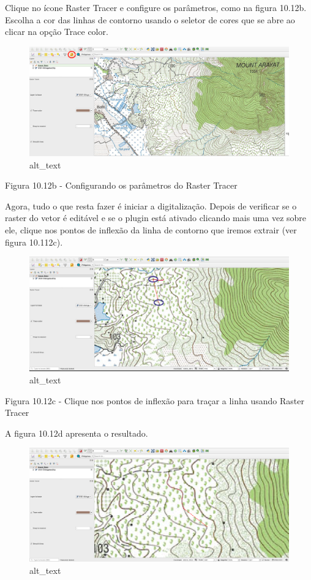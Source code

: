 \documentclass[
  portuguese,
]{krantz}
\begin{document}
Clique no ícone Raster Tracer e configure os parâmetros, como na figura 10.12b. Escolha a cor das linhas de contorno usando o seletor de cores que se abre ao clicar na opção Trace color.

\begin{figure}
\centering
\includegraphics{media/modulo10/fig1012_b.png}
\caption{alt\_text}
\end{figure}

Figura 10.12b - Configurando os parâmetros do Raster Tracer

Agora, tudo o que resta fazer é iniciar a digitalização. Depois de verificar se o raster do vetor é editável e se o plugin está ativado clicando mais uma vez sobre ele, clique nos pontos de inflexão da linha de contorno que iremos extrair (ver figura 10.112c).

\begin{figure}
\centering
\includegraphics{media/modulo10/fig1012_c.png}
\caption{alt\_text}
\end{figure}

Figura 10.12c - Clique nos pontos de inflexão para traçar a linha usando Raster Tracer

A figura 10.12d apresenta o resultado.

\begin{figure}
\centering
\includegraphics{media/modulo10/fig1012_d.png}
\caption{alt\_text}
\end{figure}
\end{document}
